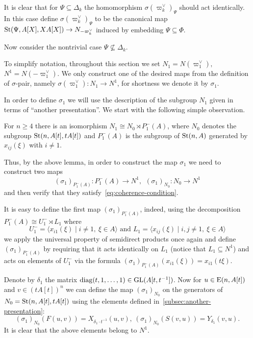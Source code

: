 It is clear that for $\Psi \subseteq \Delta_k$ the homomorphism $\sigma(\varpi_k^\vee)_\Psi$ should act identically.
In this case define $\sigma(\varpi_k^\vee)_\Psi$ to be the canonical map $\operatorname{St}(\Psi, A[X], XA[X]) \to N_{-\varpi_k^\vee}$
induced by embedding $\Psi \subseteq \Phi$.

Now consider the nontrivial case $\Psi \not\subseteq \Delta_k$.

To simplify notation, throughout this section we set $N_1 = N(\varpi_1^\vee),$ $N^1 = N(-\varpi_1^\vee)$.
We only construct one of the desired maps from the definition of $\sigma$-pair, namely $\sigma(\varpi_1^\vee) \colon N_1 \to N^1$,
for shortness we denote it by $\sigma_1$.

In order to define $\sigma_1$ we will use the description of the subgroup $N_1$ given in terms of ``another presentation''.
We start with the following simple observation.
\begin{lemma}
    \label{lem:n1-decomp} For $n\geq 4$ there is an isomorphism $N_1 \cong N_{0} \rtimes P_1^-(A)$,
    where $N_{0}$ denotes the subgroup $\operatorname{St}(n, A[t], tA[t])$ and $P_1^-(A)$ is the subgroup of $\operatorname{St}(n, A)$ generated by $x_{ij}(\xi)$ with $i\neq 1$.
\end{lemma}

Thus, by the above lemma, in order to construct the map $\sigma_1$ we need to construct two maps
\[ (\sigma_1)_{P_1^-(A)} \colon P_1^-(A) \to N^1, \ \ (\sigma_1)_{N_{0}} \colon N_{0} \to N^1\]
and then verify that they satisfy~\eqref{eq:coherence-condition}.

It is easy to define the first map $(\sigma_1)_{P_1^-(A)}$, indeed, using the decomposition $P_1^-(A) \cong U^-_1 \rtimes L_1$ where %
\[U^-_1 = \langle x_{i1}(\xi) \mid i\neq 1,\ \xi\in A \rangle \text{ and } L_1 = \langle x_{ij}(\xi) \mid i,  j \neq 1,\ \xi\in A\rangle \]
we apply the universal property of semidirect products once again
and define $(\sigma_1)_{P_1^-(A)}$ by requiring that it acts identically on $L_1$ (notice that $L_1 \subseteq N^1$) %
and acts on elements of $U^-_1$ via the formula $(\sigma_1)_{P_1^-(A)}(x_{i1}(\xi))= x_{i1}(t\xi)$.


Denote by $\delta_1$ the matrix $\mathrm{diag}(t, 1, \ldots, 1) \in \operatorname{GL}(A[t, t^{-1}])$.
Now for $u \in \operatorname{E}(n, A[t])$ and $v \in (tA[t])^n$ we can define the map $(\sigma_1)_{N_0}$ on the generators of $N_{0}=\operatorname{St}(n, A[t], tA[t])$
using the elements defined in~\cref{subsec:another-presentation}:
\begin{equation*}
(\sigma_1)
    _{N_0} (F(u, v)) = X_{\delta_1 \cdot t^{-1}}(u, v),\ (\sigma_1)_{N_0} (S(v, u)) = Y_{\delta_1}(v, u).
\end{equation*}
It is clear that the above elements belong to $N^1$.


